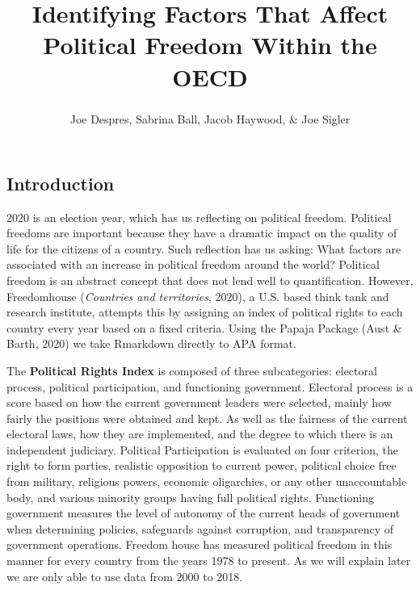 \documentclass[
  english,
  man,floatsintext]{apa6}
\title{Identifying Factors That Affect Political Freedom Within the OECD}
\author{Joe Despres\textsuperscript{}, Sabrina Ball\textsuperscript{}, Jacob Haywood\textsuperscript{}, \& Joe Sigler\textsuperscript{}}
\date{}
\affiliation{\vspace{0.5cm}\textsuperscript{} Michigan State University\\
November 30, 2020}
\begin{document}
\maketitle

\hypertarget{introduction}{%
\subsection{Introduction}\label{introduction}}

2020 is an election year, which has us reflecting on political freedom. Political freedoms are important because they have a dramatic impact on the quality of life for the citizens of a country. Such reflection has us asking: What factors are associated with an increase in political freedom around the world? Political freedom is an abstract concept that does not lend well to quantification. However, Freedomhouse (\emph{Countries and territories}, 2020), a U.S. based think tank and research institute, attempts this by assigning an index of political rights to each country every year based on a fixed criteria. Using the Papaja Package (Aust \& Barth, 2020) we take Rmarkdown directly to APA format.

The \textbf{Political Rights Index} is composed of three subcategories: electoral process, political participation, and functioning government. Electoral process is a score based on how the current government leaders were selected, mainly how fairly the positions were obtained and kept. As well as the fairness of the current electoral laws, how they are implemented, and the degree to which there is an independent judiciary. Political Participation is evaluated on four criterion, the right to form parties, realistic opposition to current power, political choice free from military, religious powers, economic oligarchies, or any other unaccountable body, and various minority groups having full political rights. Functioning government measures the level of autonomy of the current heads of government when determining policies, safeguards against corruption, and transparency of government operations. Freedom house has measured political freedom in this manner for every country from the years 1978 to present. As we will explain later we are only able to use data from 2000 to 2018.
\end{document}
